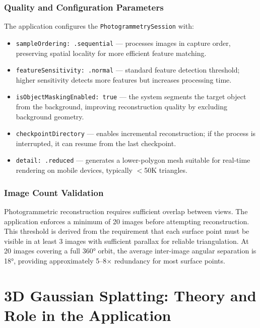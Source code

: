 \subsubsection{Quality and Configuration Parameters}

The application configures the \texttt{PhotogrammetrySession} with:

\begin{itemize}
    \item \texttt{sampleOrdering: .sequential} — processes images in capture order, preserving spatial locality for more efficient feature matching.
    \item \texttt{featureSensitivity: .normal} — standard feature detection threshold; higher sensitivity detects more features but increases processing time.
    \item \texttt{isObjectMaskingEnabled: true} — the system segments the target object from the background, improving reconstruction quality by excluding background geometry.
    \item \texttt{checkpointDirectory} — enables incremental reconstruction; if the process is interrupted, it can resume from the last checkpoint.
    \item \texttt{detail: .reduced} — generates a lower-polygon mesh suitable for real-time rendering on mobile devices, typically $<$50K triangles.
\end{itemize}

\subsubsection{Image Count Validation}

Photogrammetric reconstruction requires sufficient overlap between views. The application enforces a minimum of 20 images before attempting reconstruction. This threshold is derived from the requirement that each surface point must be visible in at least 3 images with sufficient parallax for reliable triangulation. At 20 images covering a full 360° orbit, the average inter-image angular separation is 18°, providing approximately 5--8$\times$ redundancy for most surface points.


\section{3D Gaussian Splatting: Theory and Role in the Application}
\label{sec:gaussian_splatting}


